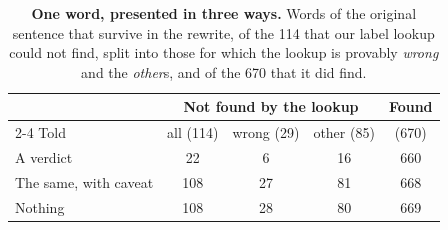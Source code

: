 \begin{table}[t]
\centering
\small
\setlength{\tabcolsep}{2.5pt}
\caption{\textbf{One word, presented in three ways.} Words of the original sentence that survive in the rewrite, of the 114 that our label lookup could not find, split into those for which the lookup is provably \emph{wrong} and the \emph{other}s, and of the 670 that it did find.}
\label{tab:supp_arms}
\begin{tabular}{@{}lcccc@{}}
\toprule
 & \multicolumn{3}{c}{Not found by the lookup} & Found \\
\cmidrule(lr){2-4}
Told & all (114) & wrong (29) & other (85) & (670) \\
\midrule
A verdict & 22 & 6 & 16 & 660 \\
The same, with caveat & 108 & 27 & 81 & 668 \\
Nothing & 108 & 28 & 80 & 669 \\
\bottomrule
\end{tabular}
\end{table}
